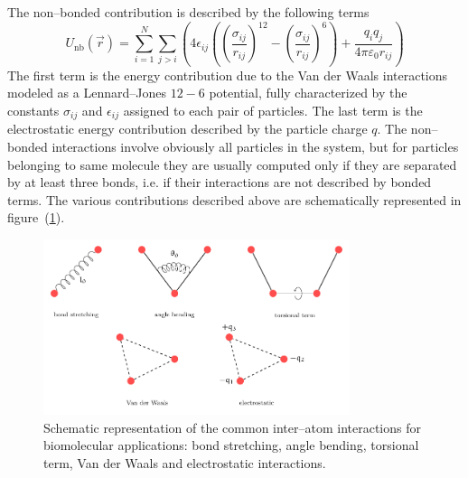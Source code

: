 The non--bonded contribution is described by the following terms
\begin{equation}
	U_\text{nb}(\vec r) = \sum_{i=1}^N \sum_{j>i} \left ( {4\epsilon_{ij} \left ( \left ( \frac{\sigma_{ij}}{r_{ij}} \right )^{12} - \left ( \frac{\sigma_{ij}}{r_{ij}} \right )^6 \right )  + \frac{q_iq_j}{4\pi\varepsilon_0 r_{ij}}} \right )
	\label{eq:nonbonPEF}
\end{equation}
The first term is the energy contribution due to the Van der Waals interactions modeled as a Lennard--Jones
$12-6$ potential, fully characterized by the constants $\sigma_{ij}$ and $\epsilon_{ij}$ assigned to each
pair of particles. The last term is the electrostatic energy contribution described by the particle charge $q$. The
non--bonded interactions involve obviously all particles in the system, but for particles belonging to same
molecule they are usually computed only if they are separated by at least three bonds, i.e. if their interactions 
are not described by bonded terms. The various contributions described above are schematically represented in
figure~(\ref{fig:FFInteraction}).
\begin{figure}[!ht]
	\centering
	\includegraphics[width=0.8\textwidth]{./img/interPartInt/interPartInt}
	\caption{Schematic representation of the common inter--atom interactions for biomolecular applications: bond stretching, angle bending, torsional term, Van der Waals and electrostatic interactions.}%
	\label{fig:FFInteraction}
\end{figure}

